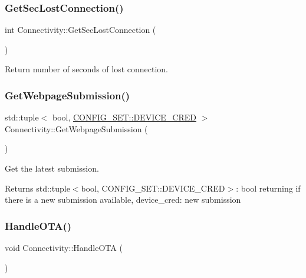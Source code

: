 \subsubsection{\texorpdfstring{Get\+Sec\+Lost\+Connection()}{GetSecLostConnection()}}
{\footnotesize\ttfamily int Connectivity\+::\+Get\+Sec\+Lost\+Connection (\begin{DoxyParamCaption}{ }\end{DoxyParamCaption})}



Return number of seconds of lost connection. 

\mbox{\label{classConnectivity_a00c4168c7ac1db84abb5aa70f8f168c5}} 
\subsubsection{\texorpdfstring{Get\+Webpage\+Submission()}{GetWebpageSubmission()}}
{\footnotesize\ttfamily std\+::tuple$<$ bool, \hyperlink{structCONFIG__SET_1_1DEVICE__CRED}{C\+O\+N\+F\+I\+G\+\_\+\+S\+E\+T\+::\+D\+E\+V\+I\+C\+E\+\_\+\+C\+R\+ED} $>$ Connectivity\+::\+Get\+Webpage\+Submission (\begin{DoxyParamCaption}{ }\end{DoxyParamCaption})}



Get the latest submission. 

\begin{DoxyReturn}{Returns}
std\+::tuple$<$bool, C\+O\+N\+F\+I\+G\+\_\+\+S\+E\+T\+::\+D\+E\+V\+I\+C\+E\+\_\+\+C\+R\+E\+D$>$\+: bool returning if there is a new submission available, device\+\_\+cred\+: new submission 
\end{DoxyReturn}
\mbox{\label{classConnectivity_a29f2a5d6cbd259bcae65b7f7ba53b730}} 
\subsubsection{\texorpdfstring{Handle\+O\+T\+A()}{HandleOTA()}}
{\footnotesize\ttfamily void Connectivity\+::\+Handle\+O\+TA (\begin{DoxyParamCaption}{ }\end{DoxyParamCaption})}



